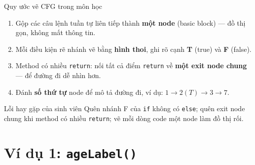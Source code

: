 \documentclass[aspectratio=169,12pt]{beamer}
\begin{document}
\begin{frame}[shrink=8]{Quy ước vẽ CFG trong môn học}
  \begin{enumerate}
    \item Gộp các câu lệnh tuần tự liên tiếp thành \textbf{một node}
      (basic block) --- đồ thị gọn, không mất thông tin.
    \item Mỗi điều kiện rẽ nhánh vẽ bằng \textbf{hình thoi}, ghi rõ cạnh
      \textbf{T} (true) và \textbf{F} (false).
    \item Method có nhiều \texttt{return}: nối tất cả điểm \texttt{return}
      về \textbf{một exit node chung} --- để đường đi dễ nhìn hơn.
    \item Đánh \textbf{số thứ tự} node để mô tả đường đi, ví dụ:
      $1 \to 2(T) \to 3 \to 7$.
  \end{enumerate}

  \vspace{0.3em}
  \begin{alertblock}{Lỗi hay gặp của sinh viên}
    Quên nhánh F của \texttt{if} không có \texttt{else};
    quên exit node chung khi method có nhiều \texttt{return};
    vẽ mỗi dòng code một node làm đồ thị rối.
  \end{alertblock}
\end{frame}



\section{Ví dụ 1: \texttt{ageLabel()}}
\end{document}
